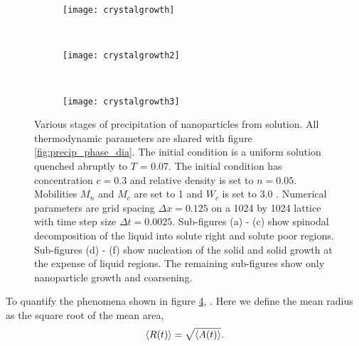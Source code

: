 \begin{figure}
    \vspace{0.25cm}
    \begin{subfigure}[b]{0.3\textwidth}
        \texttt{[image: crystalgrowth]}
        \label{fig:crystalgrowth}
        \caption{}
    \end{subfigure}
    ~
    \begin{subfigure}[b]{0.3\textwidth}
        \texttt{[image: crystalgrowth2]}
        \label{fig:crystalgrowth2}
        \caption{}
    \end{subfigure}
    ~ 
    \begin{subfigure}[b]{0.3\textwidth}
        \texttt{[image: crystalgrowth3]}
        \label{fig:crystalgrowth3}
        \caption{}
    \end{subfigure}
    \caption[Stages of precipitation of nanoparticles from solution]{
        \label{fig:precipitation}
        Various stages of precipitation of nanoparticles from solution. All
        thermodynamic parameters are shared with figure
        \ref{fig:precip_phase_dia}. The initial condition is a uniform solution
        quenched abruptly to $T$ = 0.07. The initial condition has
        concentration $c = 0.3$ and relative density is set to $n = 0.05$. Mobilities
        $M_n$ and $M_c$ are set to 1 and $W_c$ is set to 3.0 . Numerical
        parameters are grid spacing $\Delta x = 0.125$ on a 1024 by 1024
        lattice with time step size $\Delta t = 0.0025$. Sub-figures (a) - (c)
        show spinodal decomposition of the liquid into solute right and solute
        poor regions. Sub-figures (d) - (f) show nucleation of the solid and
        solid growth at the expense of liquid regions.  The remaining
        sub-figures show only nanoparticle growth and coarsening.
    }
\end{figure}
%

%
To quantify the phenomena shown in figure \ref{fig:precipitation}, . Here we define the mean radius as the square root of the mean area,
%
\begin{equation}
    \left\langle R(t) \right\rangle = \sqrt{\left\langle A(t) \right\rangle}.
\end{equation}
%

